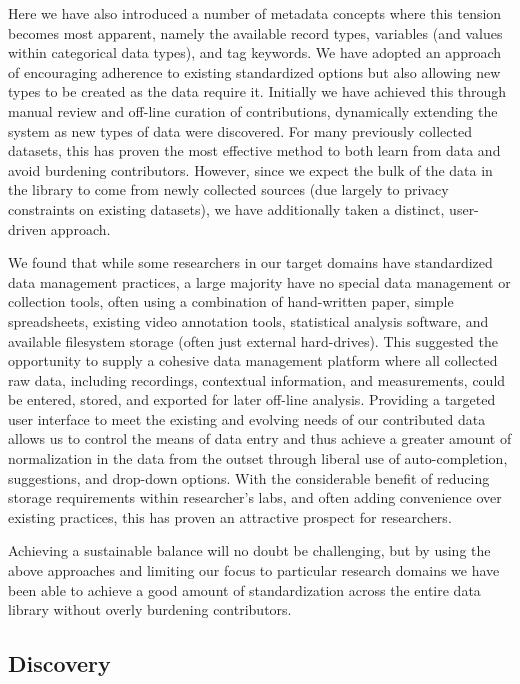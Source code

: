 \documentclass{sig-alternate}
\begin{document}
Here we have also introduced a number of metadata concepts where this tension becomes most apparent, namely the available record types, variables (and values within categorical data types), and tag keywords.
We have adopted an approach of encouraging adherence to existing standardized options but also allowing new types to be created as the data require it.
Initially we have achieved this through manual review and off-line curation of contributions, dynamically extending the system as new types of data were discovered.
For many previously collected datasets, this has proven the most effective method to both learn from data and avoid burdening contributors.
However, since we expect the bulk of the data in the library to come from newly collected sources (due largely to privacy constraints on existing datasets), we have additionally taken a distinct, user-driven approach.

We found that while some researchers in our target domains have standardized data management practices, a large majority have no special data management or collection tools, often using a combination of hand-written paper, simple spreadsheets, existing video annotation tools, statistical analysis software, and available filesystem storage (often just external hard-drives).
This suggested the opportunity to supply a cohesive data management platform where all collected raw data, including recordings, contextual information, and measurements, could be entered, stored, and exported for later off-line analysis.
Providing a targeted user interface to meet the existing and evolving needs of our contributed data allows us to control the means of data entry and thus achieve a greater amount of normalization in the data from the outset through liberal use of auto-completion, suggestions, and drop-down options.
With the considerable benefit of reducing storage requirements within researcher's labs, and often adding convenience over existing practices, this has proven an attractive prospect for researchers.

Achieving a sustainable balance will no doubt be challenging, but by using the above approaches and limiting our focus to particular research domains we have been able to achieve a good amount of standardization across the entire data library without overly burdening contributors.

\subsection{Discovery}
\end{document}

